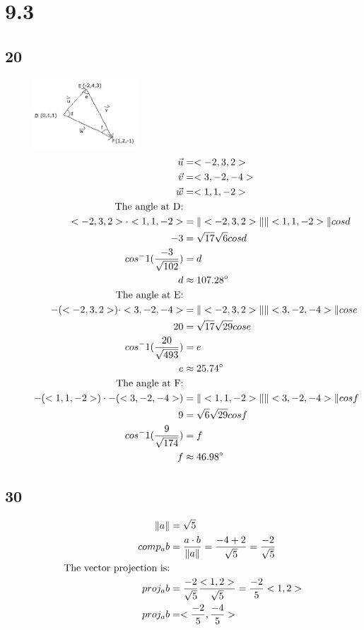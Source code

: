 \documentclass{article}%
\begin{document}
%
\section*{9.3}%
\subsection*{20}%


\begin{figure}[h!]%
\centering%
\includegraphics[width=150px]{tri2.jpg}%
\begin{alignat*}{2}%
\vec{u} &= <-2,3,2>\\%
\vec{v} &= <3,-2,-4>\\%
\vec{w} &= <1,1,-2>\\%
\textnormal{The angle at D:} \\%
<-2,3,2>\cdot<1,1,-2> &=\|<-2,3,2>\| \|<1,1,-2>\|cosd\\%
-3 &= \sqrt{17}\sqrt{6}cosd\\%
cos^-1(\frac{-3}{\sqrt{102}}) &= d\\%
d & \approx{107.28}^\circ\\%
\textnormal{The angle at E:} \\%
-(<-2,3,2>)\cdot<3,-2,-4> &=\|<-2,3,2>\| \|<3,-2,-4>\|cose\\%
20 &= \sqrt{17}\sqrt{29}cose\\%
cos^-1(\frac{20}{\sqrt{493}}) &= e\\%
e & \approx{25.74}^\circ\\%
\textnormal{The angle at F:} \\%
-(<1,1,-2>)\cdot-(<3,-2,-4>) &=\|<1,1,-2>\| \|<3,-2,-4>\|cosf\\%
9 &= \sqrt{6}\sqrt{29}cosf\\%
cos^-1(\frac{9}{\sqrt{174}}) &= f\\%
f & \approx{46.98}^\circ\\%
\end{alignat*}%
\end{figure}

%
\subsection*{30}%
\begin{alignat*}{2}%
\|a\| &= \sqrt{5}\\%
comp_a b &= \frac{a \cdot b}{\|a\|} = \frac{-4+2}{\sqrt{5}} = \frac{-2}{\sqrt{5}}\\%
\textnormal{The vector projection is:}\\%
proj_a b &= \frac{-2}{\sqrt{5}}\frac{<1,2>}{\sqrt{5}} = \frac{-2}{5} <1,2>\\%
proj_a b &= <\frac{-2}{5}, \frac{-4}{5}>%
\end{alignat*}
\end{document}
